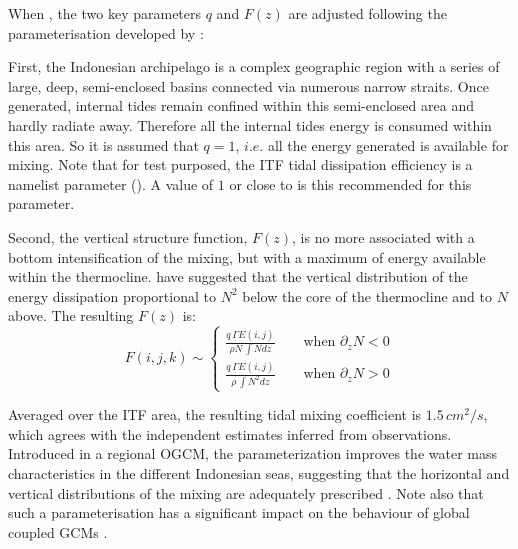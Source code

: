 \documentclass[../tex_main/NEMO_manual]{subfiles}
\begin{document}
When , the two key parameters $q$ and $F(z)$ are adjusted following 
the parameterisation developed by \citet{Koch-Larrouy_al_GRL07}:

First, the Indonesian archipelago is a complex geographic region 
with a series of large, deep, semi-enclosed basins connected via 
numerous narrow straits. Once generated, internal tides remain 
confined within this semi-enclosed area and hardly radiate away. 
Therefore all the internal tides energy is consumed within this area. 
So it is assumed that $q = 1$, $i.e.$ all the energy generated is available for mixing.
Note that for test purposed, the ITF tidal dissipation efficiency is a 
namelist parameter (). A value of $1$ or close to is
this recommended for this parameter.

Second, the vertical structure function, $F(z)$, is no more associated
with a bottom intensification of the mixing, but with a maximum of 
energy available within the thermocline. \citet{Koch-Larrouy_al_GRL07} 
have suggested that the vertical distribution of the energy dissipation 
proportional to $N^2$ below the core of the thermocline and to $N$ above. 
The resulting $F(z)$ is:
\begin{equation} \label{eq:Fz_itf}
F(i,j,k) \sim     \left\{ \begin{aligned}
\frac{q\,\Gamma E(i,j) } {\rho N \, \int N     dz}    \qquad \text{when $\partial_z N < 0$} \\
\frac{q\,\Gamma E(i,j) } {\rho     \, \int N^2 dz}    \qquad \text{when $\partial_z N > 0$}
                      \end{aligned} \right.
\end{equation}

Averaged over the ITF area, the resulting tidal mixing coefficient is $1.5\,cm^2/s$, 
which agrees with the independent estimates inferred from observations. 
Introduced in a regional OGCM, the parameterization improves the water mass 
characteristics in the different Indonesian seas, suggesting that the horizontal 
and vertical distributions of the mixing are adequately prescribed 
\citep{Koch-Larrouy_al_GRL07, Koch-Larrouy_al_OD08a, Koch-Larrouy_al_OD08b}.
Note also that such a parameterisation has a significant impact on the behaviour 
of global coupled GCMs \citep{Koch-Larrouy_al_CD10}.


\end{document}
